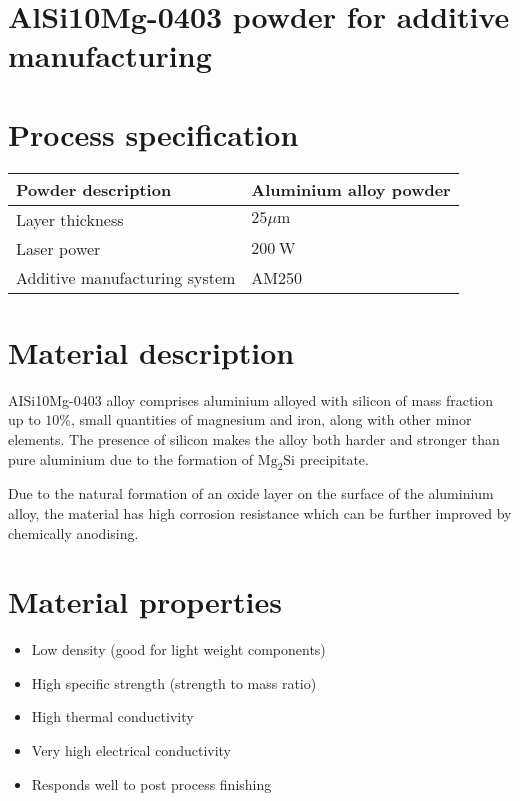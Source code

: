 \documentclass[10pt]{article}
\begin{document}
\section*{AlSi10Mg-0403 powder for additive manufacturing}
\section*{Process specification}
\begin{center}
\begin{tabular}{|l|l|}
\hline
Powder description & Aluminium alloy powder \\
\hline
Layer thickness & $25 \mu \mathrm{m}$ \\
\hline
Laser power & $200 \mathrm{~W}$ \\
\hline
Additive manufacturing system & AM250 \\
\hline
\end{tabular}
\end{center}

\section*{Material description}
AISi10Mg-0403 alloy comprises aluminium alloyed with silicon of mass fraction up to $10 \%$, small quantities of magnesium and iron, along with other minor elements. The presence of silicon makes the alloy both harder and stronger than pure aluminium due to the formation of $\mathrm{Mg}_{2} \mathrm{Si}$ precipitate.

Due to the natural formation of an oxide layer on the surface of the aluminium alloy, the material has high corrosion resistance which can be further improved by chemically anodising.

\section*{Material properties}
\begin{itemize}
  \item Low density (good for light weight components)

  \item High specific strength (strength to mass ratio)

  \item High thermal conductivity

  \item Very high electrical conductivity

  \item Responds well to post process finishing

\end{itemize}
\end{document}
